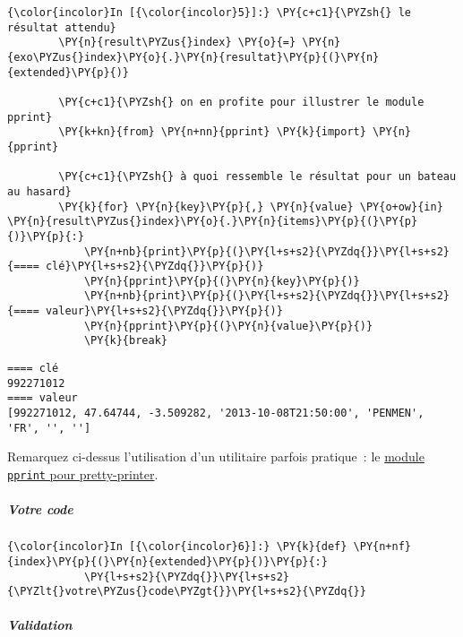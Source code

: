     \begin{Verbatim}[commandchars=\\\{\},frame=single,framerule=0.3mm,rulecolor=\color{cellframecolor}]
{\color{incolor}In [{\color{incolor}5}]:} \PY{c+c1}{\PYZsh{} le résultat attendu}
        \PY{n}{result\PYZus{}index} \PY{o}{=} \PY{n}{exo\PYZus{}index}\PY{o}{.}\PY{n}{resultat}\PY{p}{(}\PY{n}{extended}\PY{p}{)}
        
        \PY{c+c1}{\PYZsh{} on en profite pour illustrer le module pprint}
        \PY{k+kn}{from} \PY{n+nn}{pprint} \PY{k}{import} \PY{n}{pprint}
        
        \PY{c+c1}{\PYZsh{} à quoi ressemble le résultat pour un bateau au hasard}
        \PY{k}{for} \PY{n}{key}\PY{p}{,} \PY{n}{value} \PY{o+ow}{in} \PY{n}{result\PYZus{}index}\PY{o}{.}\PY{n}{items}\PY{p}{(}\PY{p}{)}\PY{p}{:}
            \PY{n+nb}{print}\PY{p}{(}\PY{l+s+s2}{\PYZdq{}}\PY{l+s+s2}{==== clé}\PY{l+s+s2}{\PYZdq{}}\PY{p}{)}
            \PY{n}{pprint}\PY{p}{(}\PY{n}{key}\PY{p}{)}
            \PY{n+nb}{print}\PY{p}{(}\PY{l+s+s2}{\PYZdq{}}\PY{l+s+s2}{==== valeur}\PY{l+s+s2}{\PYZdq{}}\PY{p}{)}
            \PY{n}{pprint}\PY{p}{(}\PY{n}{value}\PY{p}{)}
            \PY{k}{break}
\end{Verbatim}


    \begin{Verbatim}[commandchars=\\\{\},frame=single,framerule=0.3mm,rulecolor=\color{cellframecolor}]
==== clé
992271012
==== valeur
[992271012, 47.64744, -3.509282, '2013-10-08T21:50:00', 'PENMEN', 'FR', '', '']
\end{Verbatim}

    Remarquez ci-dessus l'utilisation d'un utilitaire parfois pratique~: le
\href{https://docs.python.org/3/library/pprint.html}{module
\texttt{pprint} pour pretty-printer}.

    \hypertarget{votre-code}{%
\subparagraph{Votre code}\label{votre-code}}

    \begin{Verbatim}[commandchars=\\\{\},frame=single,framerule=0.3mm,rulecolor=\color{cellframecolor}]
{\color{incolor}In [{\color{incolor}6}]:} \PY{k}{def} \PY{n+nf}{index}\PY{p}{(}\PY{n}{extended}\PY{p}{)}\PY{p}{:}
            \PY{l+s+s2}{\PYZdq{}}\PY{l+s+s2}{\PYZlt{}votre\PYZus{}code\PYZgt{}}\PY{l+s+s2}{\PYZdq{}}
\end{Verbatim}


    \hypertarget{validation}{%
\subparagraph{Validation}\label{validation}}


